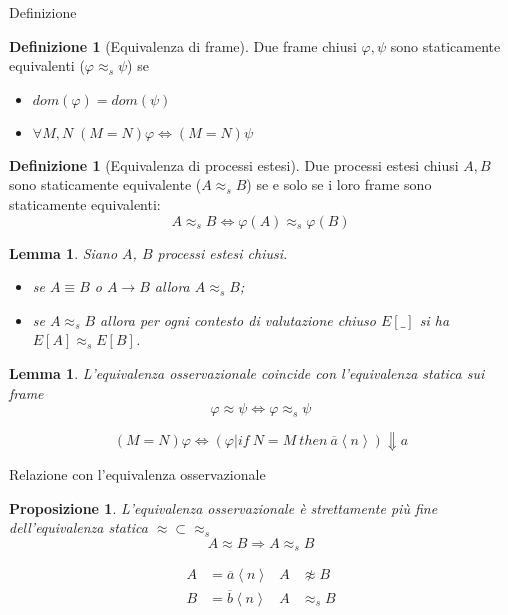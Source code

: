 \documentclass{beamer}
\newcounter{counter1}
\theoremstyle{plain}
\newtheorem{mylem}[counter1]{Lemma}
\newtheorem{mypro}[counter1]{Proposizione}
\theoremstyle{definition}
\newtheorem{mydef}[counter1]{Definizione}
\theoremstyle{remark}
\newcommand{\obar}[1]{\overline{#1}}
\newcommand{\pa}[1]{\left(#1\right)}
\newcommand{\ang}[1]{\left<#1\right>}
\begin{document}
\begin{frame}{Definizione}
  \begin{mydef}[Equivalenza di frame]
    Due frame chiusi $\varphi, \psi$ sono staticamente equivalenti
    ($\varphi \approx _s \psi$) se
    \begin{itemize}
    \item $dom(\varphi) = dom(\psi)$
    \item $\forall M,N\; (M=N)\varphi \Leftrightarrow (M=N)\psi$
    \end{itemize}
  \end{mydef}

  \begin{mydef}[Equivalenza di processi estesi]
    Due processi estesi chiusi $A,B$ sono staticamente equivalente
    ($A \approx_s B$) se e solo se i loro frame sono staticamente
    equivalenti:
    \[ A \approx _s B \Leftrightarrow \varphi(A) \approx _s \varphi(B) \]
  \end{mydef}
\end{frame}

\begin{frame}
  \begin{mylem}
    Siano $A$, $B$ processi estesi chiusi.
    \begin{itemize}
    \item se $A \equiv B$ o $A \rightarrow B$ allora $A \approx _s B$;
    \item se $A \approx _s B$ allora per ogni contesto di valutazione
      chiuso $E[\_]$ si ha $E[A] \approx _s E[B]$.
    \end{itemize}
  \end{mylem}
  \vfill
  
  \begin{mylem}
    L'equivalenza osservazionale coincide con l'equivalenza statica
    sui frame
    \[ \varphi \approx \psi \Leftrightarrow \varphi \approx _s \psi \]
  \end{mylem}
  \pause 
  \[ (M=N)\varphi \Leftrightarrow \pa{ \varphi | if\ N=M\ then\
      \obar{a}\ang{n}} \Downarrow a \]
\end{frame}
\begin{frame}{Relazione con l'equivalenza osservazionale}
  \begin{mypro}
    L'equivalenza osservazionale \`e strettamente pi\`u fine
    dell'equivalenza statica $\approx \subset \approx _s$
    \[ A \approx B \Rightarrow A \approx _s B \]
  \end{mypro}
  \vfill

  \begin{align*}
    A &= \obar{a}\ang{n} & A &\not\approx B \\
    B &= \obar{b}\ang{n} & A &\approx _s B 
  \end{align*}
\end{frame}
\end{document}
